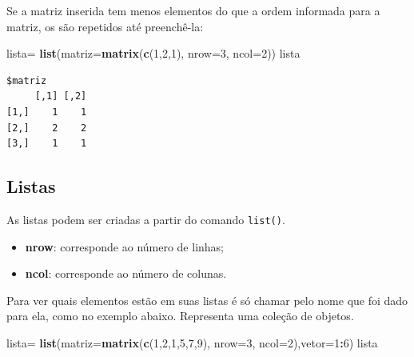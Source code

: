 \documentclass[12pt,portuguese,oneside]{book}
\newenvironment{Shaded}{\begin{snugshade}}{\end{snugshade}}
\newcommand{\KeywordTok}[1]{\textcolor[rgb]{0.13,0.29,0.53}{\textbf{#1}}}
\newcommand{\DataTypeTok}[1]{\textcolor[rgb]{0.13,0.29,0.53}{#1}}
\newcommand{\DecValTok}[1]{\textcolor[rgb]{0.00,0.00,0.81}{#1}}
\newcommand{\StringTok}[1]{\textcolor[rgb]{0.31,0.60,0.02}{#1}}
\newcommand{\OperatorTok}[1]{\textcolor[rgb]{0.81,0.36,0.00}{\textbf{#1}}}
\newcommand{\NormalTok}[1]{#1}
\providecommand{\tightlist}{%
  \setlength{\itemsep}{0pt}\setlength{\parskip}{0pt}}
\begin{document}
Se a matriz inserida tem menos elementos do que a ordem informada para a
matriz, os são repetidos até preenchê-la:

\begin{Shaded}
\begin{Highlighting}[]
\NormalTok{lista=}\StringTok{ }\KeywordTok{list}\NormalTok{(}\DataTypeTok{matriz=}\KeywordTok{matrix}\NormalTok{(}\KeywordTok{c}\NormalTok{(}\DecValTok{1}\NormalTok{,}\DecValTok{2}\NormalTok{,}\DecValTok{1}\NormalTok{), }\DataTypeTok{nrow=}\DecValTok{3}\NormalTok{, }\DataTypeTok{ncol=}\DecValTok{2}\NormalTok{))}
\NormalTok{lista}
\end{Highlighting}
\end{Shaded}

\begin{verbatim}
$matriz
     [,1] [,2]
[1,]    1    1
[2,]    2    2
[3,]    1    1
\end{verbatim}

\subsection{Listas}\label{listas}

As listas podem ser criadas a partir do comando \texttt{list()}.

\begin{itemize}
\tightlist
\item
  \textbf{nrow}: corresponde ao número de linhas;
\item
  \textbf{ncol}: corresponde ao número de colunas.
\end{itemize}

Para ver quais elementos estão em suas listas é só chamar pelo nome que
foi dado para ela, como no exemplo abaixo. Representa uma coleção de
objetos.

\begin{Shaded}
\begin{Highlighting}[]
\NormalTok{lista=}\StringTok{ }\KeywordTok{list}\NormalTok{(}\DataTypeTok{matriz=}\KeywordTok{matrix}\NormalTok{(}\KeywordTok{c}\NormalTok{(}\DecValTok{1}\NormalTok{,}\DecValTok{2}\NormalTok{,}\DecValTok{1}\NormalTok{,}\DecValTok{5}\NormalTok{,}\DecValTok{7}\NormalTok{,}\DecValTok{9}\NormalTok{), }\DataTypeTok{nrow=}\DecValTok{3}\NormalTok{, }\DataTypeTok{ncol=}\DecValTok{2}\NormalTok{),}\DataTypeTok{vetor=}\DecValTok{1}\OperatorTok{:}\DecValTok{6}\NormalTok{)}
\NormalTok{lista}
\end{Highlighting}
\end{Shaded}
\end{document}

